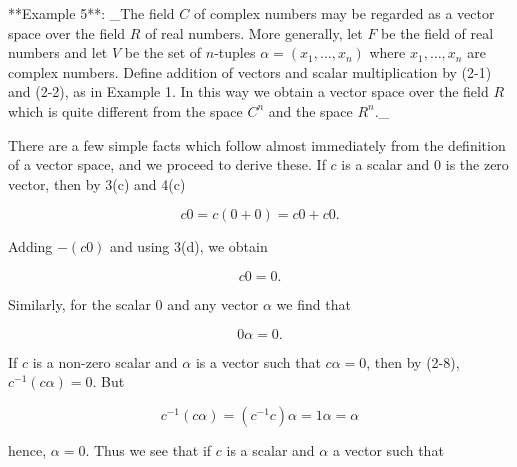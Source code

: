 

**Example 5**: _The field \(C\) of complex numbers may be regarded as a vector space over the field \(R\) of real numbers. More generally, let \(F\) be the field of real numbers and let \(V\) be the set of \(n\)-tuples \(\alpha=(x_{1},\ldots,x_{n})\) where \(x_{1},\ldots,x_{n}\) are complex numbers. Define addition of vectors and scalar multiplication by (2-1) and (2-2), as in Example 1. In this way we obtain a vector space over the field \(R\) which is quite different from the space \(C^{n}\) and the space \(R^{n}\)._

There are a few simple facts which follow almost immediately from the definition of a vector space, and we proceed to derive these. If \(c\) is a scalar and \(0\) is the zero vector, then by 3(c) and 4(c)

\[c0=c(0+0)=c0+c0.\]

Adding \(-(c0)\) and using 3(d), we obtain

\[c0=0.\]

Similarly, for the scalar \(0\) and any vector \(\alpha\) we find that

\[0\alpha=0.\]

If \(c\) is a non-zero scalar and \(\alpha\) is a vector such that \(c\alpha=0\), then by (2-8), \(c^{-1}(c\alpha)=0\). But

\[c^{-1}(c\alpha)=(c^{-1}c)\alpha=1\alpha=\alpha\]

hence, \(\alpha=0\). Thus we see that if \(c\) is a scalar and \(\alpha\) a vector such that